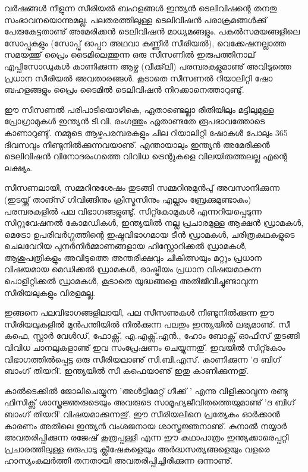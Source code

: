 ﻿
\vskip 2pt

വര്‍ഷങ്ങള്‍ നീളുന്ന സീരിയല്‍ ബഹളങ്ങള്‍ ഇന്ത്യന്‍ ടെലിവിഷന്റെ തനതു സംഭാവനയൊന്നുമല്ല. പലതരത്തിലുള്ള ടെലിവിഷന്‍ 
പരാക്രമങ്ങള്‍ക്കു് പേരുകേട്ടതാണു് അമേരിക്കന്‍ ടെലിവിഷന്‍ മാധ്യമങ്ങളും. പകല്‍സമയങ്ങളിലെ സോപ്പുകളും 
(സോപ്പു് ഓപ്പറ അഥവാ കണ്ണീര്‍ സീരിയല്‍), വെക്കേഷനല്ലാത്ത സമയത്തു് പ്രൈം ടൈമിലെത്തുന്ന ഒരു സീസണില്‍ 
ഇരുപത്തിനാല് എപ്പിസോഡുകള്‍ കാണിക്കുന്ന ആഴ്ച (വീക്ക്‌ലി) പരമ്പരകളുമാണു് അവിടുത്തെ പ്രധാന സീരിയല്‍ അവതാരങ്ങള്‍. 
കൂടാതെ സീസണല്‍ റിയാലിറ്റി ഷോ ബഹളങ്ങളും പ്രൈം ടൈമില്‍ ടെലിവിഷന്‍ നിറക്കാനെത്താറുണ്ടു്.

ഈ സീസണല്‍ പരിപാടിയൊഴികെ, ഏതാണ്ടെല്ലാ രീതിയിലും മട്ടിലുമുള്ള പ്രോഗ്രാമുകള്‍ ഇന്ത്യന്‍ ടി.വി. രംഗത്തും ഏതാണ്ടതേ
 രൂപഭാവത്തോടെ കാണാറുണ്ടു്. നമ്മുടെ ആഴ്ചപരമ്പരകളും ചില റിയാലിറ്റി ഷോകള്‍ പോലും 365 ദിവസവും നീണ്ടുനില്‍ക്കുന്നവയാണു്.
  എന്തായാലും ഇന്ത്യന്‍ അമേരിക്കന്‍ ടെലിവിഷന്‍ വിനോദരംഗത്തെ വിവിധ ട്രെന്റുകളെ വിലയിരുത്തലല്ല എന്റെ ലക്ഷ്യം.

സീസണലായി, സമ്മറിനുശേഷം തുടങ്ങി സമ്മറിനുമുന്‍പു് അവസാനിക്കുന്ന (ഇടയ്ക്കു് താങ്സ് ഗിവിങ്ങിനും ക്രിസ്മസിനും എല്ലാം 
ബ്രേക്കുമുണ്ടാകും) പരമ്പരകളില്‍ പല വിഭാഗങ്ങളുണ്ടു്. സിറ്റ്കോമുകള്‍ എന്നറിയപ്പെടുന്ന സിറ്റുവേഷനല്‍ കോമഡികള്‍, ഇന്ത്യയില്‍ 
നല്ല പ്രചാരമുള്ള ആക്ഷന്‍ ഡ്രാമകള്‍, മെട്രോ ഉപരിവര്‍ഗ്ഗത്തിന്റെ ഇഷ്ടവിഭാഗമായ ടീന്‍ ഡ്രാമകള്‍, ചരിത്രകഥകളുടെ ചെലവേറിയ
 പുനര്‍നിര്‍മ്മാണങ്ങളായ ഹിസ്റ്റോറിക്കല്‍ ഡ്രാമകള്‍, ആശുപത്രികളും അവിടുത്തെ അന്തരീക്ഷവും ചികിത്സയും മറ്റും പ്രധാന 
 വിഷയമായ മെഡിക്കല്‍ ഡ്രാമകള്‍, രാഷ്ട്രീയം പ്രധാന വിഷയമാകുന്ന പൊളിറ്റിക്കല്‍ ഡ്രാമകള്‍, കൂടാതെ യുദ്ധങ്ങളെ 
 അതിജീവിച്ചുണ്ടാവുന്ന സീരിയലുകളും വിരളമല്ല.

ഇങ്ങനെ പലവിഭാഗങ്ങളിലായി, പല സീസണുകള്‍ നീണ്ടുനില്‍ക്കുന്ന ഈ സീരിയലുകളില്‍ മുന്‍പന്തിയില്‍ നില്‍ക്കുന്ന പലതും 
ഇന്ത്യയില്‍ ലഭ്യമാണു്. സീ കഫെ, സ്റ്റാര്‍ വേള്‍ഡ്, ഫോക്സ്, എ.എക്സ്.എന്‍., ഹോം ബോക്സ് ഓഫീസ് തുടങ്ങി വിവിധ ചാനലുകളാണു് 
ഇവ സംപ്രേഷണം ചെയ്യുന്നതു്. ഇവയില്‍ സിറ്റ്കോം വിഭാഗത്തില്‍പ്പെട്ട ഒരു സീരിയലാണു് സി.ബി.എസ്. കാണിക്കുന്ന 
'ദ ബിഗ് ബാംഗ് തിയറി'. ഇന്ത്യയില്‍ സീ കഫെയാണു് ഇതു കാണിക്കുന്നതു്.

കാല്‍ടെക്കില്‍ ജോലിചെയ്യുന്ന 'അള്‍ട്ടിമേറ്റ് ഗീക്ക് ' എന്നു വിളിക്കാവുന്ന രണ്ടു ഫിസിക്സ് ശാസ്ത്രജ്ഞരുടെയും അവരുടെ
 സാമൂഹ്യജീവിതത്തെയുമാണു് 'ദ ബിഗ് ബാംഗ് തിയറി' വിഷയമാക്കുന്നതു്. ഈ സീരിയലിനെ പ്രത്യേകം ഓര്‍ക്കാന്‍ കാരണം 
 അതിലെ ഇന്ത്യന്‍ വംശജനായ ശാസ്ത്രജ്ഞനാണു്. കുനാല്‍ നയ്യാര്‍ അവതരിപ്പിക്കുന്ന രജേഷ് കൂത്രപ്പള്ളി എന്ന ഈ കഥാപാത്രം 
 ഇന്ത്യക്കാരെപ്പറ്റി പ്രചാരത്തിലുള്ള ഒരുപാടു ക്ലീഷേകളെയും അര്‍ദ്ധസത്യങ്ങളെയും വളരെ ഹാസ്യംകലര്‍ത്തി തനതായി
  അവതരിപ്പിച്ചിരിക്കുന്ന ഒന്നാണു്.

